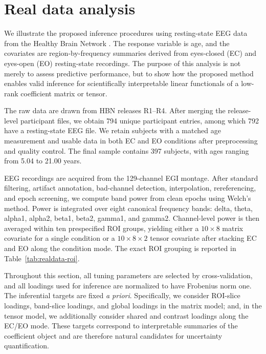 \documentclass[authoryear,preprint,review,12pt]{elsarticle}
\begin{document}
\section{Real data analysis}\label{sec:realdata}
We illustrate the proposed inference procedures using resting-state EEG data from the Healthy Brain Network \citep{Alexander2017HBN}. The response variable is age, and the covariates are region-by-frequency summaries derived from eyes-closed (EC) and eyes-open (EO) resting-state recordings. The purpose of this analysis is not merely to assess predictive performance, but to show how the proposed method enables valid inference for scientifically interpretable linear functionals of a low-rank coefficient matrix or tensor.

The raw data are drawn from HBN releases R1--R4. After merging the release-level participant files, we obtain 794 unique participant entries, among which 792 have a resting-state EEG file. We retain subjects with a matched age measurement and usable data in both EC and EO conditions after preprocessing and quality control. The final sample contains 397 subjects, with ages ranging from 5.04 to 21.00 years.

EEG recordings are acquired from the 129-channel EGI montage. After standard filtering, artifact annotation, bad-channel detection, interpolation, rereferencing, and epoch screening, we compute band power from clean epochs using Welch's method. Power is integrated over eight canonical frequency bands: delta, theta, alpha1, alpha2, beta1, beta2, gamma1, and gamma2. Channel-level power is then averaged within ten prespecified ROI groups, yielding either a $10\times 8$ matrix covariate for a single condition or a $10\times 8\times 2$ tensor covariate after stacking EC and EO along the condition mode. The exact ROI grouping is reported in Table~\ref{tab:realdata-roi}.

Throughout this section, all tuning parameters are selected by cross-validation, and all loadings used for inference are normalized to have Frobenius norm one. The inferential targets are fixed \emph{a priori}. Specifically, we consider ROI-slice loadings, band-slice loadings, and global loadings in the matrix model; and, in the tensor model, we additionally consider shared and contrast loadings along the EC/EO mode. These targets correspond to interpretable summaries of the coefficient object and are therefore natural candidates for uncertainty quantification.


\end{document}
